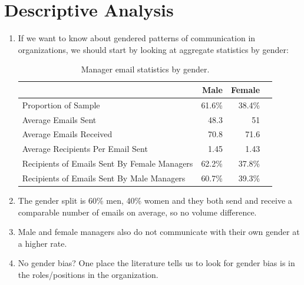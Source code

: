\documentclass[fleqn]{MJDArticle}
\begin{document}
\section{Descriptive Analysis}
\begin{enumerate}
	\item If we want to know about gendered patterns of communication in organizations, we should start by looking at aggregate statistics by gender:
	
	
	\begin{table}[H]
	\centering
		\begin{tabular}{m{2in}rrr}
		\toprule
	& \textbf{Male} & \textbf{Female}  \\
		 \midrule
		 Proportion of Sample & 61.6\%& 38.4\% \\
		 Average Emails Sent & 48.3 & 51 \\
		 Average Emails Received & 70.8 & 71.6 \\
		 Average Recipients Per Email Sent & 1.45 & 1.43 \\
		 Recipients of Emails Sent By Female Managers & 62.2\% & 37.8\% \\
		 Recipients of Emails Sent By Male Managers & 60.7\% & 39.3\%  \\
		\bottomrule
		\end{tabular}
		\caption{\label{tab:email agg stats}Manager email statistics by gender.}
	\end{table}
	
	\item The gender split is 60\% men, 40\% women and they both send and receive a comparable number of emails on average, so no volume difference.
	\item Male and female managers also do not communicate with their own gender at a higher rate. 
	\item No gender bias? One place the literature tells us to look for gender bias is in the roles/positions in the organization.
	

\end{enumerate}
\end{document}
